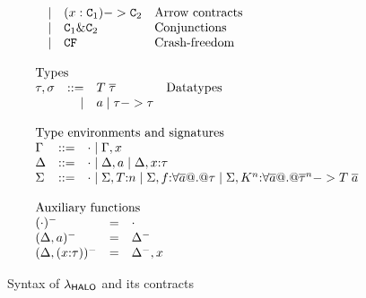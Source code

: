 \begin{figure}
\[\begin{array}{l}
\begin{array}{lrll}
     & \mid &  (x : \Ct_1) -> \Ct_2      & \text{Arrow contracts} \\
     & \mid & \Ct_1 \& \Ct_2             & \text{Conjunctions}   \\
     & \mid & \CF                        & \text{Crash-freedom}   \\
\end{array}
\\ \\
\begin{array}{lrll}
\multicolumn{3}{l}{\text{Types}} \\
\tau,\sigma & ::=  & T\;\taus & \text{Datatypes} \\
            & \mid & a \mid \tau -> \tau
\end{array}
\\ \\
\begin{array}{lrll}
\multicolumn{3}{l}{\text{Type environments and signatures}} \\
\Gamma & ::=  & \cdot \mid \Gamma,x \\
\Delta & ::=  & \cdot \mid \Delta,a \mid \Delta,x{:}\tau \\
\Sigma & ::=  & \cdot \mid \Sigma,T{:}n \mid \Sigma,f{:}\forall\ol{a} @.@ \tau \mid \Sigma,K^{\ar}{:}\forall\ol{a} @.@ \oln{\tau}{\ar} -> T\;\as
\end{array}
\\ \\
\begin{array}{lrll}
\multicolumn{3}{l}{\text{Auxiliary functions}} \\
(\cdot)^{-}            & = & \cdot \\
(\Delta,a)^{-}         & = & \Delta^{-} \\
(\Delta,(x{:}\tau))^{-} & = & \Delta^{-},x
\end{array}
\end{array}\]
\caption{Syntax of $\lambda_{\sf HALO}$ and its contracts}\label{fig:syntax}
\end{figure}

